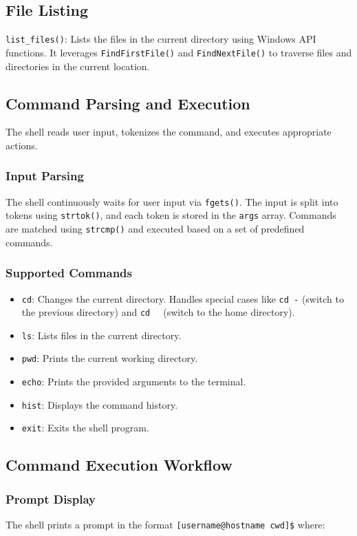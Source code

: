 \documentclass[conference]{IEEEtran}
\begin{document}
\subsection{File Listing}
\texttt{list\_files()}: Lists the files in the current directory using Windows API functions. It leverages \texttt{FindFirstFile()} and \texttt{FindNextFile()} to traverse files and directories in the current location.

\subsection{Command Parsing and Execution}
The shell reads user input, tokenizes the command, and executes appropriate actions.

\subsubsection{Input Parsing}
The shell continuously waits for user input via \texttt{fgets()}. The input is split into tokens using \texttt{strtok()}, and each token is stored in the \texttt{args} array. Commands are matched using \texttt{strcmp()} and executed based on a set of predefined commands.

\subsubsection{Supported Commands}
\begin{itemize}
\item \texttt{cd}: Changes the current directory. Handles special cases like \texttt{cd -} (switch to the previous directory) and \texttt{cd ~} (switch to the home directory).
\item \texttt{ls}: Lists files in the current directory.
\item \texttt{pwd}: Prints the current working directory.
\item \texttt{echo}: Prints the provided arguments to the terminal.
\item \texttt{hist}: Displays the command history.
\item \texttt{exit}: Exits the shell program.
\end{itemize}

\subsection{Command Execution Workflow}
\subsubsection{Prompt Display}
The shell prints a prompt in the format \texttt{[username@hostname cwd]\$} where:
\end{document}
